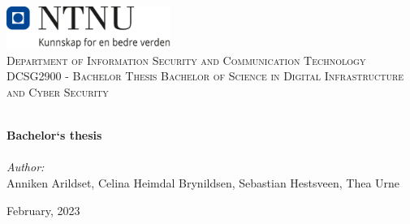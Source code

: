 \begin{titlepage}
\vbox{ }
\vbox{ }
\begin{center}
\includegraphics[width=0.40\textwidth]{Images/NTNU_logo.png}\\[1cm]
\textsc{\LARGE Department of Information Security and Communication Technology}\\[1.5cm]
\textsc{\Large DCSG2900 -  Bachelor Thesis Bachelor of Science in Digital Infrastructure and Cyber Security}\\[0.5cm]
\vbox{ }

\HRule \\[0.4cm]
{ \huge \bfseries Bachelor`s thesis}\\[0.4cm]
\HRule \\[1.5cm]

\large
\emph{Author:}\\
Anniken Arildset, Celina Heimdal Brynildsen, Sebastian Hestsveen, Thea Urne
\vfill

{\large February, 2023}
\end{center}
\end{titlepage}